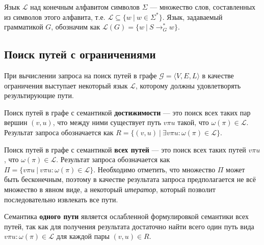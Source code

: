 Язык $\mathcal{L}$ над конечным алфавитом символов $\Sigma$ --- множество слов, составленных из символов этого алфавита, т.е. $\mathcal{L} \subseteq \{w~|~w \in \Sigma ^*\}$. Язык, задаваемый грамматикой $G$, обозначим как $\mathcal{L}(G) = \{w~|~S \rightarrow^*_G w\}$.


\subsection{Поиск путей с ограничениями}

При вычислении запроса на поиск путей в графе $\mathcal{G} = \langle V, E, L \rangle$ в качестве ограничения выступает некоторый язык $\mathcal{L}$, которому должны удовлетворять результирующие пути.

Поиск путей в графе с семантикой \textbf{достижимости} --- это поиск всех таких пар вершин $(v,u)$, что между ними существует путь $v \pi u$ такой, что $\omega (\pi) \in \mathcal{L}$. Результат запроса обозначается как $R = \{ (v,u)~|~\exists v \pi u : \omega (\pi) \in \mathcal{L} \}$.

Поиск путей в графе с семантикой \textbf{всех путей} --- это поиск всех таких путей $v \pi u$,   что $\omega (\pi) \in \mathcal{L}$. Результат запроса обозначается как $\Pi = \{ v \pi u~|~v \pi u : \omega (\pi) \in \mathcal{L} \}$.
Необходимо отметить, что множество $\Pi$ может быть бесконечным, поэтому в качестве результата запроса предполагается не всё множество в явном виде, а некоторый \textit{итератор}, который позволит последовательно извлекать все пути.

Семантика \textbf{одного пути} является ослабленной формулировкой семантики всех путей, так как для получения результата достаточно найти всего один путь вида $v \pi u : \omega (\pi) \in \mathcal{L}$ для каждой пары $(v, u) \in R$.

